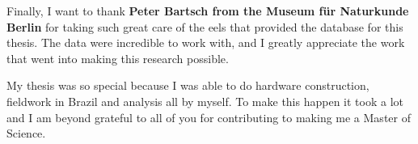 Finally, I want to thank \textbf{Peter Bartsch from the Museum für Naturkunde Berlin} for taking such great care of the eels that provided the database for this thesis. 
The data were incredible to work with, and I greatly appreciate the work that went into making this research possible.

My thesis was so special because I was able to do hardware construction, fieldwork in Brazil and analysis all by myself. 
To make this happen it took a lot and I am beyond grateful to all of you for contributing to making me a Master of Science.


